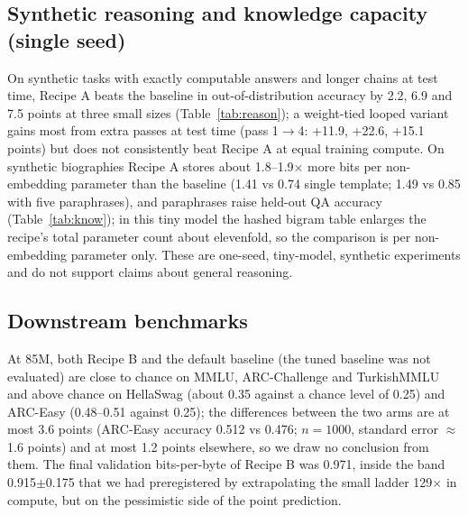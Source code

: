 \documentclass[11pt]{article}
\begin{document}
\subsection{Synthetic reasoning and knowledge capacity (single seed)}
On synthetic tasks with exactly computable answers and longer chains at test time, Recipe A beats the baseline in out-of-distribution accuracy by 2.2, 6.9 and 7.5 points at three small sizes (Table~\ref{tab:reason}); a weight-tied looped variant gains most from extra passes at test time (pass 1$\to$4: +11.9, +22.6, +15.1 points) but does not consistently beat Recipe A at equal training compute.
On synthetic biographies Recipe A stores about 1.8--1.9$\times$ more bits per non-embedding parameter than the baseline (1.41 vs 0.74 single template; 1.49 vs 0.85 with five paraphrases), and paraphrases raise held-out QA accuracy (Table~\ref{tab:know}); in this tiny model the hashed bigram table enlarges the recipe's total parameter count about elevenfold, so the comparison is per non-embedding parameter only.
These are one-seed, tiny-model, synthetic experiments and do not support claims about general reasoning.



\subsection{Downstream benchmarks}
At 85M, both Recipe B and the default baseline (the tuned baseline was not evaluated) are close to chance on MMLU, ARC-Challenge and TurkishMMLU and above chance on HellaSwag (about 0.35 against a chance level of 0.25) and ARC-Easy (0.48--0.51 against 0.25); the differences between the two arms are at most 3.6 points (ARC-Easy accuracy 0.512 vs 0.476; $n=1000$, standard error $\approx$1.6 points) and at most 1.2 points elsewhere, so we draw no conclusion from them.
The final validation bits-per-byte of Recipe B was 0.971, inside the band 0.915$\pm$0.175 that we had preregistered by extrapolating the small ladder 129$\times$ in compute, but on the pessimistic side of the point prediction.
\end{document}
